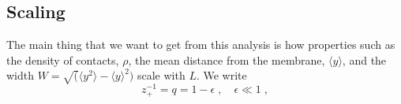 \documentclass[a4paper,10pt]{article}
\newcommand{\Or}{\mathcal{O}}
\newcommand{\OLL}{\Or\left(\frac{1}{L^2}\right)}
\begin{document}
\subsection{Scaling}

The main thing that we want to get from this analysis is how properties such as the density of contacts, $\rho$, the mean distance from the membrane, $\langle y \rangle$, and the width $W = \sqrt( \langle y^2 \rangle - \langle y \rangle^2)$ scale with $L$. 
We write
\begin{equation}
  z_+^{-1} = q = 1 - \epsilon \;, \quad \epsilon \ll 1 \;, 
\end{equation}
\end{document}
